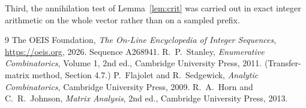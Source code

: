 \documentclass[11pt,a4paper]{article}
\theoremstyle{plain}
\theoremstyle{definition}
\begin{document}
Third, the annihilation test of Lemma~\ref{lem:crit} was carried out in exact integer
arithmetic on the whole vector rather than on a sampled prefix.

\begin{thebibliography}{9}
 The OEIS Foundation, \emph{The On-Line Encyclopedia of Integer
Sequences}, \url{https://oeis.org}, 2026. Sequence A268941.
 R.~P.~Stanley, \emph{Enumerative Combinatorics}, Volume 1, 2nd ed.,
Cambridge University Press, 2011. (Transfer-matrix method, Section 4.7.)
 P.~Flajolet and R.~Sedgewick, \emph{Analytic Combinatorics}, Cambridge
University Press, 2009.
 R.~A.~Horn and C.~R.~Johnson, \emph{Matrix Analysis}, 2nd ed., Cambridge
University Press, 2013.
\end{thebibliography}
\end{document}
